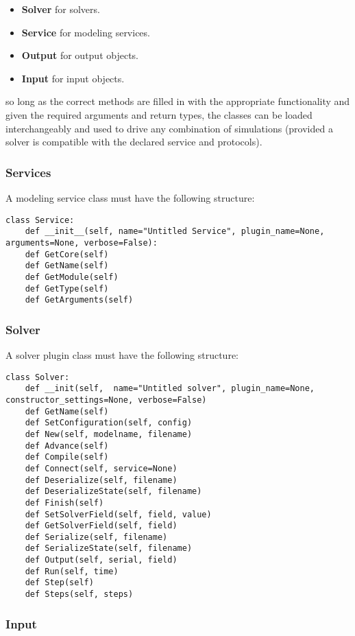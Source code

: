 \documentclass[12pt]{article}
\begin{document}
\begin{itemize}
	\item[] {\bf Solver} for solvers.
	\item[] {\bf Service} for modeling services.
	\item[] {\bf Output} for output objects.
	\item[] {\bf Input} for input objects.
\end{itemize}

so long as the correct methods are filled in with the appropriate functionality and given the required arguments and return types,  the classes can be loaded interchangeably and used to drive any combination of simulations (provided a solver is compatible with the declared service and protocols). 

\subsubsection*{Services}

A modeling service class must have the following structure:

\begin{verbatim}
class Service:
	def __init__(self, name="Untitled Service", plugin_name=None, arguments=None, verbose=False):
	def GetCore(self)
	def GetName(self)
	def GetModule(self)
	def GetType(self)
	def GetArguments(self)
\end{verbatim}

\subsubsection*{Solver}

A solver plugin class must have the following structure:

\begin{verbatim}
class Solver:
	def __init(self,  name="Untitled solver", plugin_name=None, constructor_settings=None, verbose=False)
	def GetName(self)
	def SetConfiguration(self, config)
	def New(self, modelname, filename)
	def Advance(self)
	def Compile(self)
	def Connect(self, service=None)
	def Deserialize(self, filename)
	def DeserializeState(self, filename)
	def Finish(self)
	def SetSolverField(self, field, value)
	def GetSolverField(self, field)
	def Serialize(self, filename)
	def SerializeState(self, filename)
	def Output(self, serial, field)
	def Run(self, time)
	def Step(self)
	def Steps(self, steps)
\end{verbatim}


\subsubsection*{Input}
\end{document}
